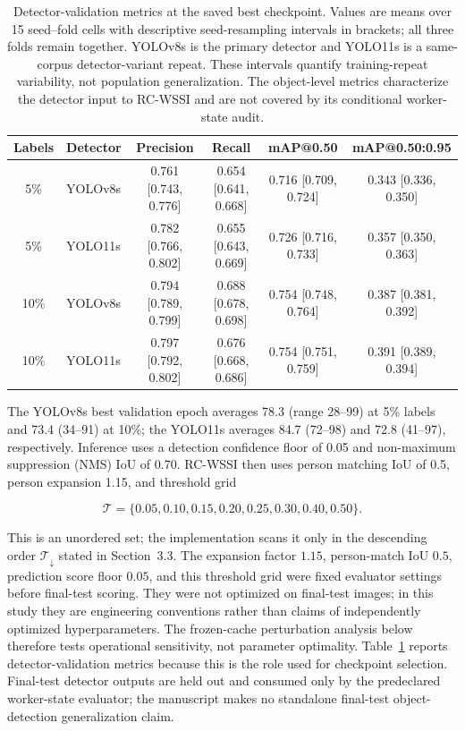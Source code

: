 \documentclass[iicol,pdflatex,sn-mathphys-num]{sn-jnl}
\begin{document}
\begin{table}[t]
\caption{Detector-validation metrics at the saved best checkpoint. Values are means over 15 seed--fold cells with descriptive seed-resampling intervals in brackets; all three folds remain together. YOLOv8s is the primary detector and YOLO11s is a same-corpus detector-variant repeat. These intervals quantify training-repeat variability, not population generalization. The object-level metrics characterize the detector input to RC-WSSI and are not covered by its conditional worker-state audit.}
\label{tab:detector}
\centering
\scriptsize
\setlength{\tabcolsep}{5pt}
\begin{tabular}{@{}c l c c c c@{}}
\toprule
Labels & Detector & Precision & Recall & mAP@0.50 & mAP@0.50:0.95 \\
\midrule
5\%  & YOLOv8s & 0.761 [0.743, 0.776] & 0.654 [0.641, 0.668] & 0.716 [0.709, 0.724] & 0.343 [0.336, 0.350] \\
5\%  & YOLO11s & 0.782 [0.766, 0.802] & 0.655 [0.643, 0.669] & 0.726 [0.716, 0.733] & 0.357 [0.350, 0.363] \\
10\% & YOLOv8s & 0.794 [0.789, 0.799] & 0.688 [0.678, 0.698] & 0.754 [0.748, 0.764] & 0.387 [0.381, 0.392] \\
10\% & YOLO11s & 0.797 [0.792, 0.802] & 0.676 [0.668, 0.686] & 0.754 [0.751, 0.759] & 0.391 [0.389, 0.394] \\
\bottomrule
\end{tabular}
\end{table}

The YOLOv8s best validation epoch averages 78.3 (range 28--99) at 5\% labels and 73.4 (34--91) at 10\%; the YOLO11s averages 84.7 (72--98) and 72.8 (41--97), respectively. Inference uses a detection confidence floor of 0.05 and non-maximum suppression (NMS) IoU of 0.70. RC-WSSI then uses person matching IoU of 0.5, person expansion 1.15, and threshold grid

\begin{equation}
\mathcal{T}=\{0.05,0.10,0.15,0.20,0.25,0.30,0.40,0.50\}.
\end{equation}

This is an unordered set; the implementation scans it only in the descending order $\mathcal{T}_{\downarrow}$ stated in Section~3.3. The expansion factor $1.15$, person-match IoU $0.5$, prediction score floor $0.05$, and this threshold grid were fixed evaluator settings before final-test scoring. They were not optimized on final-test images; in this study they are engineering conventions rather than claims of independently optimized hyperparameters. The frozen-cache perturbation analysis below therefore tests operational sensitivity, not parameter optimality. Table~\ref{tab:detector} reports detector-validation metrics because this is the role used for checkpoint selection. Final-test detector outputs are held out and consumed only by the predeclared worker-state evaluator; the manuscript makes no standalone final-test object-detection generalization claim.
\end{document}
